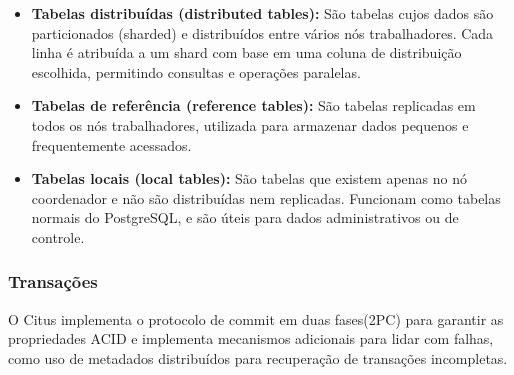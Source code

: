 \begin{itemize}
    \item \textbf{Tabelas distribuídas (distributed tables):} 
    São tabelas cujos dados são particionados (sharded) e distribuídos entre vários nós trabalhadores. Cada linha é atribuída a um shard com base em uma coluna de distribuição escolhida, permitindo consultas e operações paralelas.
    
    \item \textbf{Tabelas de referência (reference tables):} 
    São tabelas replicadas em todos os nós trabalhadores, 
	utilizada para armazenar dados pequenos e frequentemente acessados. 
    
    \item \textbf{Tabelas locais (local tables):} 
    São tabelas que existem apenas no nó coordenador e não são distribuídas nem replicadas. 
	Funcionam como tabelas normais do PostgreSQL, e são úteis para dados administrativos ou de controle.
\end{itemize}

\subsubsection{Transações}
O Citus implementa o protocolo de commit em duas fases(2PC) para garantir as propriedades ACID
e implementa mecanismos adicionais para lidar com falhas, como uso de metadados distribuídos para 
recuperação de transações incompletas.